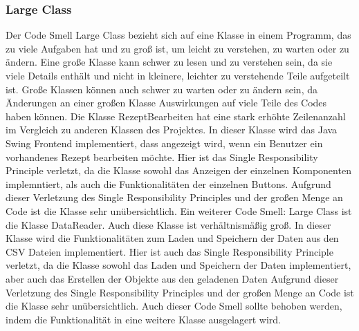 \subsubsection{Large Class}
Der Code Smell Large Class bezieht sich auf eine Klasse in einem Programm, das zu viele Aufgaben hat und zu groß ist, um leicht zu verstehen, zu warten oder zu ändern. Eine große Klasse kann schwer zu lesen und zu verstehen sein, da sie viele Details enthält und nicht in kleinere, leichter zu verstehende Teile aufgeteilt ist. Große Klassen können auch schwer zu warten oder zu ändern sein, da Änderungen an einer großen Klasse Auswirkungen auf viele Teile des Codes haben können. Die Klasse RezeptBearbeiten hat eine stark erhöhte Zeilenanzahl im Vergleich zu anderen Klassen des Projektes. In dieser Klasse wird das Java Swing Frontend implementiert, dass angezeigt wird, wenn ein Benutzer ein vorhandenes Rezept bearbeiten möchte. Hier ist das
Single Responsibility Principle verletzt, da die Klasse sowohl das Anzeigen der einzelnen Komponenten implemntiert, als auch die Funktionalitäten der einzelnen Buttons. Aufgrund dieser Verletzung des Single Responsibility Principles und der großen Menge an Code ist die Klasse sehr unübersichtlich. Ein weiterer Code Smell: Large Class ist die Klasse DataReader. Auch diese Klasse ist verhältnismäßig groß. In dieser Klasse wird die Funktionalitäten zum Laden und Speichern der Daten aus den CSV Dateien implementiert. Hier ist auch das Single Responsibility Principle verletzt, da die Klasse sowohl das Laden und Speichern der Daten implementiert, aber auch das Erstellen der Objekte aus den geladenen Daten Aufgrund dieser Verletzung des Single Responsibility Principles und der großen Menge an Code ist die Klasse sehr unübersichtlich. Auch dieser Code Smell sollte behoben werden, indem die Funktionalität in eine weitere Klasse ausgelagert wird.
